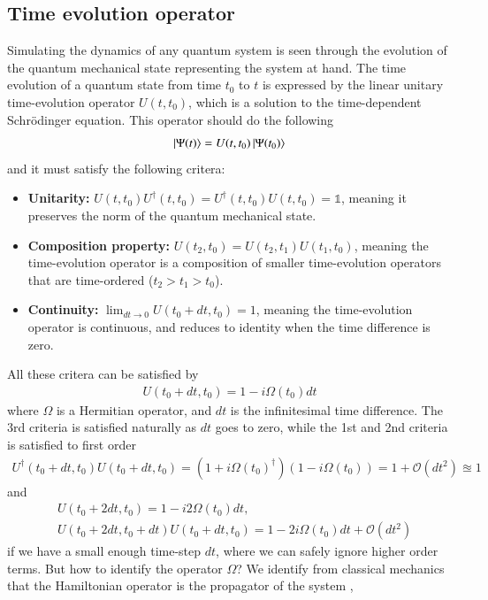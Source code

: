 \documentclass{subfiles}
\begin{document}
\subsection*{Time evolution operator}
Simulating the dynamics of any quantum system is seen through the evolution of the quantum mechanical state representing the system at hand. The time evolution of a quantum state from time $t_0$ to $t$ is expressed by the linear unitary time-evolution operator $U(t, t_0)$, which is a solution to the time-dependent Schrödinger equation.\cite{sakurai1986modern} This operator should do the following
\begin{equation}
    \ket{\Psi(t)} = U(t, t_0)\ket{\Psi(t_0)}
\end{equation}
and it must satisfy the following critera:
\begin{itemize}
    \item \textbf{Unitarity:} $U(t, t_0)U^\dagger(t, t_0) = U^\dagger(t, t_0)U(t, t_0) = \mathbb{1}$, meaning it preserves the norm of the quantum mechanical state.
    \item \textbf{Composition property:} $U(t_2, t_0) = U(t_2, t_1)U(t_1, t_0)$, meaning the time-evolution operator is a composition of smaller time-evolution operators that are time-ordered ($t_2>t_1>t_0$).
    \item \textbf{Continuity:} $\lim_{dt\to 0}U(t_0 + dt, t_0) = \mathcal{1}$, meaning the time-evolution operator is continuous, and reduces to identity when the time difference is zero.
\end{itemize}
All these critera can be satisfied by 
\begin{align*}
    U(t_0 + dt, t_0) = 1 - i\Omega(t_0) dt
\end{align*}
where $\Omega$ is a Hermitian operator, and $dt$ is the infinitesimal time difference. The 3rd criteria is satisfied naturally as $dt$ goes to zero, while the 1st and 2nd criteria is satisfied to first order 
\begin{align*}
    U^\dagger(t_0 + dt, t_0)U(t_0 + dt, t_0) = (1 + i\Omega(t_0)^\dagger)(1 - i\Omega(t_0)) = 1 + \mathcal{O}(dt^2) \approxeq 1
\end{align*}
and
\begin{align*}
    &U(t_0 + 2dt, t_0) = 1 - i2\Omega(t_0)dt, \\
    &U(t_0 + 2dt, t_0 +dt)U(t_0 + dt, t_0) = 1 - 2i\Omega(t_0)dt + \mathcal{O}(dt^2)
\end{align*}
if we have a small enough time-step $dt$, where we can safely ignore higher order terms. But how to identify the operator $\Omega$? We identify from classical mechanics that the Hamiltonian operator is the propagator of the system \cite{sakurai1986modern}, 
\end{document}
